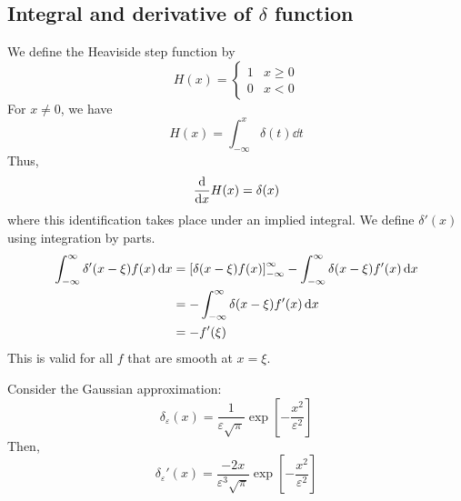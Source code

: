 \subsection{Integral and derivative of \texorpdfstring{\( \delta \)}{𝛿} function}
We define the Heaviside step function by
\[
	H(x) = \begin{cases}
		1 & x \geq 0 \\
		0 & x < 0
	\end{cases}
\]
For \( x \neq 0 \), we have
\[
	H(x) = \int_{-\infty}^x \delta(t) \dd{t}
\]
Thus,
\[
	\dv{x} H(x) = \delta(x)
\]
where this identification takes place under an implied integral.
We define \( \delta'(x) \) using integration by parts.
\begin{align*}
	\int_{-\infty}^\infty \delta'(x-\xi) f(x) \dd{x} & = \qty[\delta(x-\xi) f(x)]_{-\infty}^\infty - \int_{-\infty}^\infty \delta(x-\xi) f'(x) \dd{x} \\
	                                                 & = - \int_{-\infty}^\infty \delta(x-\xi) f'(x) \dd{x}                                           \\
	                                                 & = - f'(\xi)
\end{align*}
This is valid for all \( f \) that are smooth at \( x = \xi \).
\begin{example}
	Consider the Gaussian approximation:
	\[
		\delta_\varepsilon(x) = \frac{1}{\varepsilon \sqrt{\pi}} \exp[-\frac{x^2}{\varepsilon^2}]
	\]
	Then,
	\[
		\delta_\varepsilon'(x) = \frac{-2x}{\varepsilon^3 \sqrt{\pi}} \exp[-\frac{x^2}{\varepsilon^2}]
	\]
\end{example}

